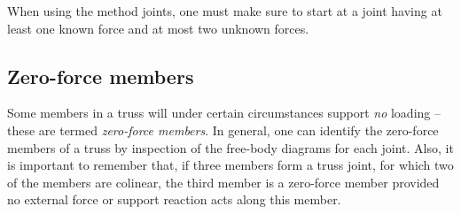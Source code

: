When using the method joints, one must make sure to start at a joint having at least one known force and at most two unknown forces. 


\subsection{Zero-force members}
Some members in a truss will under certain circumstances support \emph{no} loading -- these are termed \textit{zero-force members}. In general, one can identify the zero-force members of a truss by inspection of the free-body diagrams for each joint. Also, it is important to remember that, if three members form a truss joint, for which two of the members are colinear, the third member is a zero-force member provided no external force or support reaction acts along this member. 
